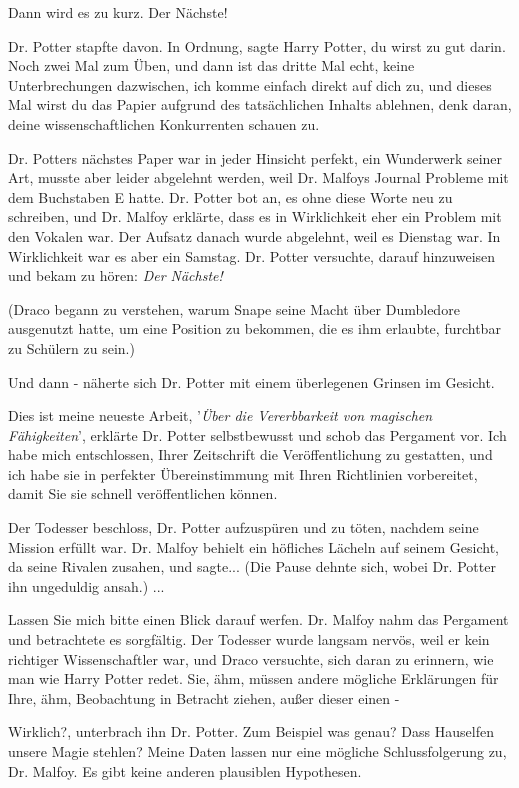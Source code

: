 \glqq Dann wird es zu kurz. Der Nächste!\grqq{}

Dr. Potter stapfte davon. \glqq In Ordnung\grqq{}, sagte Harry Potter, \glqq du
wirst zu gut darin. Noch zwei Mal zum Üben, und dann ist das dritte Mal echt,
keine Unterbrechungen dazwischen, ich komme einfach direkt auf dich zu, und
dieses Mal wirst du das Papier aufgrund des tatsächlichen Inhalts ablehnen, denk
daran, deine wissenschaftlichen Konkurrenten schauen zu.\grqq{}

Dr. Potters nächstes Paper war in jeder Hinsicht perfekt, ein Wunderwerk seiner
Art, musste aber leider abgelehnt werden, weil Dr. Malfoys Journal Probleme mit
dem Buchstaben E hatte. Dr. Potter bot an, es ohne diese Worte neu zu schreiben,
und Dr. Malfoy erklärte, dass es in Wirklichkeit eher ein Problem mit den
Vokalen war. Der Aufsatz danach wurde abgelehnt, weil es Dienstag war. In
Wirklichkeit war es aber ein Samstag. Dr. Potter versuchte, darauf hinzuweisen
und bekam zu hören: \emph{\glqq Der Nächste!\grqq{} }

(Draco begann zu verstehen, warum Snape seine Macht über Dumbledore ausgenutzt
hatte, um eine Position zu bekommen, die es ihm erlaubte, furchtbar zu Schülern
zu sein.)

Und dann - näherte sich Dr. Potter mit einem überlegenen Grinsen im Gesicht.

\glqq Dies ist meine neueste Arbeit, '\emph{Über die Vererbbarkeit von magischen
Fähigkeiten}', erklärte Dr. Potter selbstbewusst und schob das Pergament vor.
\glqq Ich habe mich entschlossen, Ihrer Zeitschrift die Veröffentlichung zu
gestatten, und ich habe sie in perfekter Übereinstimmung mit Ihren Richtlinien
vorbereitet, damit Sie sie schnell veröffentlichen können.\grqq{}

Der Todesser beschloss, Dr. Potter aufzuspüren und zu töten, nachdem seine
Mission erfüllt war. Dr. Malfoy behielt ein höfliches Lächeln auf seinem
Gesicht, da seine Rivalen zusahen, und sagte... (Die Pause dehnte sich, wobei
Dr. Potter ihn ungeduldig ansah.) ...

\glqq Lassen Sie mich bitte einen Blick darauf werfen.\grqq{} Dr. Malfoy nahm
das Pergament und betrachtete es sorgfältig. Der Todesser wurde langsam nervös,
weil er kein richtiger Wissenschaftler war, und Draco versuchte, sich daran zu
erinnern, wie man wie Harry Potter redet. \glqq Sie, ähm, müssen andere mögliche
Erklärungen für Ihre, ähm, Beobachtung in Betracht ziehen, außer dieser einen
-\grqq{}

\glqq Wirklich?\grqq{}, unterbrach ihn Dr. Potter. \glqq Zum Beispiel was genau?
Dass Hauselfen unsere Magie stehlen? Meine Daten lassen nur eine mögliche
Schlussfolgerung zu, Dr. Malfoy. Es gibt keine anderen plausiblen
Hypothesen.\grqq{}

